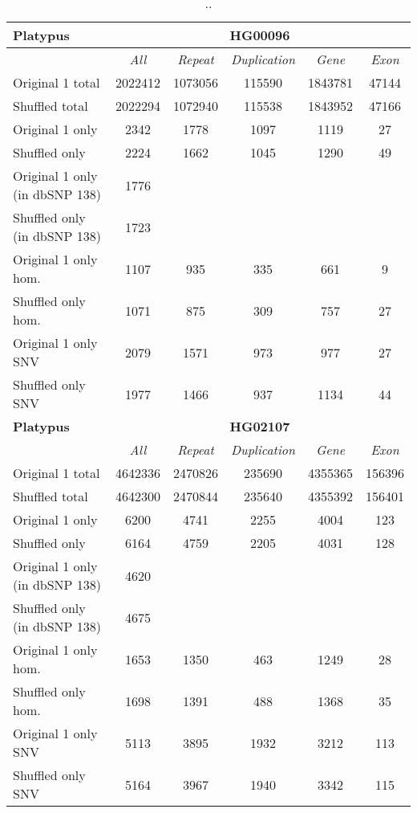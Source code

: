 \clearpage

\begin{table}[htb]
\caption{ .. }
\begin{center}
\begin{tabular}{|l|c||c|c|c|c|}
\hline
{\bf Platypus} & \multicolumn{5}{|c|}{\bf HG00096} \\
\hline
\cline{2-6}
{\bf} & {\it All} & {\it Repeat} & {\it Duplication} & {\it Gene} & {\it Exon} \\
\hline
Original 1 total & 2022412 & 1073056 & 115590 & 1843781 & 47144\\ 
\hline
Shuffled total & 2022294 & 1072940 & 115538 & 1843952 & 47166\\ 
\hline
Original 1 only & 2342 & 1778 & 1097 & 1119 & 27\\ 
\hline
Shuffled only & 2224 & 1662 & 1045 & 1290 & 49\\ 
\hline
Original 1 only (in dbSNP 138) & 1776 &  &  &  & \\ 
\hline
Shuffled only (in dbSNP 138) & 1723 &  &  &  & \\ 
\hline
Original 1 only hom. & 1107 & 935 & 335 & 661 & 9\\ 
\hline
Shuffled only hom. & 1071 & 875 & 309 & 757 & 27\\ 
\hline
Original 1 only SNV & 2079 & 1571 & 973 & 977 & 27\\ 
\hline
Shuffled only SNV & 1977 & 1466 & 937 & 1134 & 44\\ 
\hline
\hline
{\bf Platypus} & \multicolumn{5}{|c|}{\bf HG02107} \\
\hline
\cline{2-6}
{\bf} & {\it All} & {\it Repeat} & {\it Duplication} & {\it Gene} & {\it Exon} \\
\hline
Original 1 total & 4642336 & 2470826 & 235690 & 4355365 & 156396\\ 
\hline
Shuffled total & 4642300 & 2470844 & 235640 & 4355392 & 156401\\ 
\hline
Original 1 only & 6200 & 4741 & 2255 & 4004 & 123\\ 
\hline
Shuffled only & 6164 & 4759 & 2205 & 4031 & 128\\ 
\hline
Original 1 only (in dbSNP 138) & 4620 &  &  &  & \\ 
\hline
Shuffled only (in dbSNP 138) & 4675 &  &  &  & \\ 
\hline
Original 1 only hom. & 1653 & 1350 & 463 & 1249 & 28\\ 
\hline
Shuffled only hom. & 1698 & 1391 & 488 & 1368 & 35\\ 
\hline
Original 1 only SNV & 5113 & 3895 & 1932 & 3212 & 113\\ 
\hline
Shuffled only SNV & 5164 & 3967 & 1940 & 3342 & 115\\ 
\hline
\end{tabular}
\end{center}
\label{tab:orig-vs-shuf-platypus}
\end{table}

